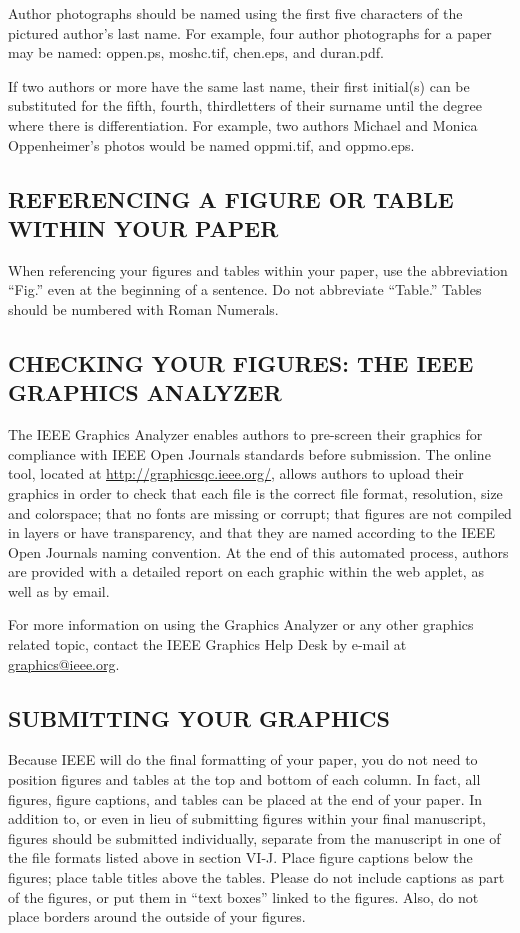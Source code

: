 Author photographs should be named using the first five characters of the 
pictured author's last name. For example, four author photographs for a 
paper may be named: oppen.ps, moshc.tif, chen.eps, and duran.pdf.

If two authors or more have the same last name, their first initial(s) can 
be substituted for the fifth, fourth, third\textellipsis letters of their surname 
until the degree where there is differentiation. For example, two authors 
Michael and Monica Oppenheimer's photos would be named oppmi.tif, and 
oppmo.eps.

\subsection{REFERENCING A FIGURE OR TABLE WITHIN YOUR PAPER}
When referencing your figures and tables within your paper, use the 
abbreviation ``Fig.'' even at the beginning of a sentence. Do not abbreviate 
``Table.'' Tables should be numbered with Roman Numerals.

\subsection{CHECKING YOUR FIGURES: THE IEEE GRAPHICS ANALYZER}
The IEEE Graphics Analyzer enables authors to pre-screen their graphics for 
compliance with IEEE Open Journals standards before submission. The online 
tool, located at \underline {http://graphicsqc.ieee.org/}, allows authors to 
upload their graphics in order to check that each file is the correct file 
format, resolution, size and colorspace; that no fonts are missing or 
corrupt; that figures are not compiled in layers or have transparency, and 
that they are named according to the IEEE Open Journals naming convention. 
At the end of this automated process, authors are provided with a detailed 
report on each graphic within the web applet, as well as by email.

For more information on using the Graphics Analyzer 
or any other graphics related topic, contact the IEEE Graphics Help Desk by 
e-mail at \underline {graphics@ieee.org}.

\subsection{SUBMITTING YOUR GRAPHICS}
Because IEEE will do the final formatting of your paper, 
you do not need to position figures and tables at the top and bottom of each 
column. In fact, all figures, figure captions, and tables can be placed at 
the end of your paper. In addition to, or even in lieu of submitting figures 
within your final manuscript, figures should be submitted individually, 
separate from the manuscript in one of the file formats listed above in 
section VI-J. Place figure captions below the figures; place table titles 
above the tables. Please do not include captions as part of the figures, or 
put them in ``text boxes'' linked to the figures. Also, do not place borders 
around the outside of your figures.

